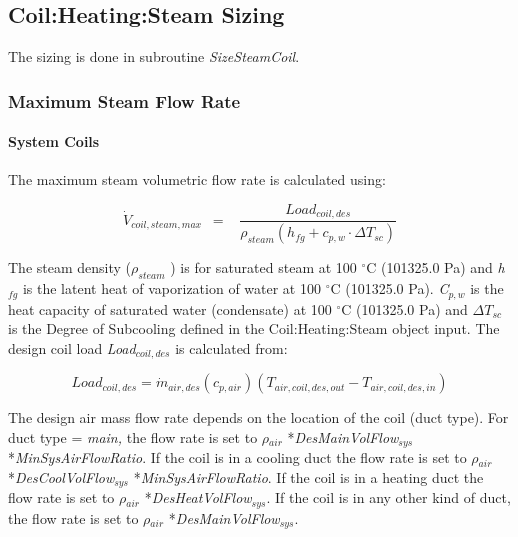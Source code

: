 \subsection{Coil:Heating:Steam Sizing}\label{coilheatingsteam-sizing}

The sizing is done in subroutine \emph{SizeSteamCoil}.

\subsubsection{Maximum Steam Flow Rate}\label{maximum-steam-flow-rate}

\paragraph{System Coils}\label{system-coils-2}

The maximum steam volumetric flow rate is calculated using:

\begin{equation}
{\dot V_{coil,steam,max}}\,\,\, = \,\,\,\,\,\frac{{Loa{d_{coil,des}}}}{{{\rho_{steam}}\left( {{h_{fg}} + {c_{p,w}}\cdot \Delta {T_{sc}}} \right)}}
\end{equation}

The steam density (\({\rho_{steam}}\) ) is for saturated steam at 100 \(^{\circ}\)C (101325.0 Pa) and \emph{h\(_{fg}\)} is the latent heat of vaporization of water at 100 \(^{\circ}\)C (101325.0 Pa). \emph{C\(_{p,w}\)} is the heat capacity of saturated water (condensate) at 100 \(^{\circ}\)C (101325.0 Pa) and \(\Delta {T_{sc}}\) is the Degree of Subcooling defined in the Coil:Heating:Steam object input. The design coil load \emph{Load\(_{coil,des}\)} is calculated from:

\begin{equation}
Loa{d_{coil,des}} = {\dot m_{air,des}}({c_{p,air}})({T_{air,coil,des,out}} - {T_{air,coil,des,in}})
\end{equation}

The design air mass flow rate depends on the location of the coil (duct type). For duct type = \emph{main,} the flow rate is set to \emph{\(\rho\)\(_{air}\)} *\emph{DesMainVolFlow\(_{sys}\)} *\emph{MinSysAirFlowRatio}. If the coil is in a cooling duct the flow rate is set to \emph{\(\rho\)\(_{air}\)} *\emph{DesCoolVolFlow\(_{sys}\)} *\emph{MinSysAirFlowRatio}. If the coil is in a heating duct the flow rate is set to \emph{\(\rho\)\(_{air}\)} *\emph{DesHeatVolFlow\(_{sys}\)}. If the coil is in any other kind of duct, the flow rate is set to \emph{\(\rho\)\(_{air}\)} *\emph{DesMainVolFlow\(_{sys}\)}.

